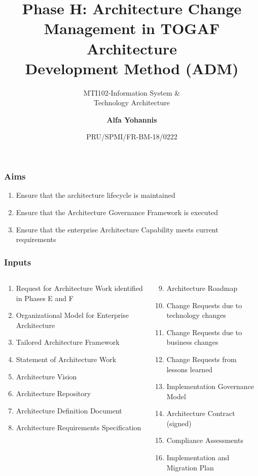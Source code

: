 \documentclass[aspectratio=169, table]{beamer}
\subtitle{MTI102-Information System \&\\Technology Architecture}
\title{\Large Phase H: Architecture Change\\Management in TOGAF
	Architecture\\Development Method (ADM)}
\date[Serial]{\scriptsize {PRU/SPMI/FR-BM-18/0222}}
\author[Pradita]{\small {\textbf{Alfa Yohannis}}}
\begin{document}
	\frame{\titlepage}

	\begin{frame}
		\frametitle{Aims}
		\begin{enumerate}
			\item Ensure that the architecture lifecycle is maintained
			\item Ensure that the Architecture Governance Framework is executed
			\item Ensure that the enterprise Architecture Capability meets current requirements
		\end{enumerate}
	\end{frame}

	\begin{frame}
		\frametitle{Inputs}
		\vspace{22pt}
		\begin{columns}[onlytextwidth]
			\begin{column}{0.5\textwidth}
				\begin{enumerate}
					\item Request for Architecture Work identified in Phases E and F
					\item Organizational Model for Enterprise Architecture
					\item Tailored Architecture Framework
					\item Statement of Architecture Work
					\item Architecture Vision
					\item Architecture Repository
					\item Architecture Definition Document
					\item Architecture Requirements Specification
				\end{enumerate}

			\end{column}
			\begin{column}{0.5\textwidth}
				\begin{enumerate}
					\setcounter{enumi}{8}
					\item Architecture Roadmap
					\item Change Requests due to technology changes
					\item Change Requests due to business changes
					\item Change Requests from lessons learned
					\item Implementation Governance Model
					\item Architecture Contract (signed)
					\item Compliance Assessments
					\item Implementation and Migration Plan
				\end{enumerate}
			\end{column}
		\end{columns}
	\end{frame}
\end{document}
